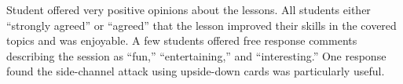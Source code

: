 Student offered very positive opinions about the lessons.
All students
either ``strongly agreed'' or ``agreed''
that the lesson improved their skills in the covered topics
and was enjoyable.
A few students offered free response comments describing the
session as ``fun,'' ``entertaining,'' and ``interesting.''  One response
found the side-channel attack using upside-down cards
was particularly useful.





%
%


